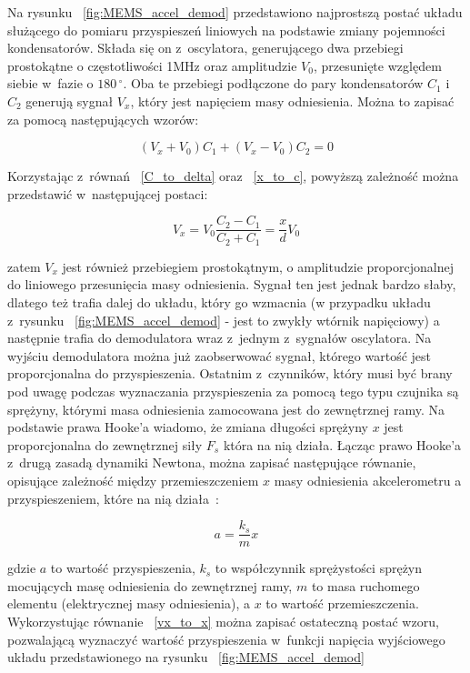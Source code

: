 \documentclass[11pt, twoside]{Thesis} %
\begin{document}
Na rysunku ~\ref{fig:MEMS_accel_demod} przedstawiono najprostszą postać układu służącego do pomiaru przyspieszeń liniowych na podstawie zmiany pojemności kondensatorów. Składa się on z~oscylatora, generującego dwa przebiegi prostokątne o częstotliwości 1MHz oraz amplitudzie $V_0$, przesunięte względem siebie w~fazie o $180\,^{\circ}$. Oba te przebiegi podłączone do pary kondensatorów $C_1$ i~$C_2$ generują sygnał $V_x$, który jest napięciem masy odniesienia. Można to zapisać za pomocą następujących wzorów:

\begin{equation}
	(V_x + V_0)C_1 + (V_x - V_0)C_2 = 0
\end{equation}  

Korzystając z~równań ~\ref{C_to_delta} oraz ~\ref{x_to_c}, powyższą zależność można przedstawić w~następującej postaci:

\begin{equation}
V_x = V_0\frac{C_2 - C_1}{C_2 + C_1} = \frac{x}{d}V_0
\label{vx_to_x}
\end{equation}

zatem $V_x$ jest również przebiegiem prostokątnym, o amplitudzie proporcjonalnej do liniowego przesunięcia masy odniesienia. Sygnał ten jest jednak bardzo słaby, dlatego też trafia dalej do układu, który go wzmacnia (w przypadku układu z~rysunku ~\ref{fig:MEMS_accel_demod} -  jest to zwykły wtórnik napięciowy) a następnie trafia do demodulatora wraz z~jednym z~sygnałów oscylatora. Na wyjściu demodulatora można już zaobserwować sygnał, którego wartość jest proporcjonalna do przyspieszenia. Ostatnim z~czynników, który musi być brany pod uwagę podczas wyznaczania przyspieszenia za pomocą tego typu czujnika są sprężyny, którymi masa odniesienia zamocowana jest do zewnętrznej ramy. Na podstawie prawa Hooke'a wiadomo, że zmiana długości sprężyny $x$ jest proporcjonalna do zewnętrznej siły $F_s$ która na nią działa. Łącząc prawo Hooke'a z~drugą zasadą dynamiki Newtona, można zapisać następujące równanie, opisujące zależność między przemieszczeniem $x$ masy odniesienia akcelerometru a przyspieszeniem, które na nią działa~\cite{mems12}:

\begin{equation}
	a = \frac{k_s}{m}x
\end{equation}  

gdzie $a$ to wartość przyspieszenia, $k_s$ to współczynnik sprężystości sprężyn mocujących masę odniesienia do zewnętrznej ramy, $m$ to masa ruchomego elementu (elektrycznej masy odniesienia), a $x$ to wartość przemieszczenia. Wykorzystując równanie ~\ref{vx_to_x} można zapisać ostateczną postać wzoru, pozwalającą wyznaczyć wartość przyspieszenia w~funkcji napięcia wyjściowego układu przedstawionego na rysunku ~\ref{fig:MEMS_accel_demod}
\end{document}
